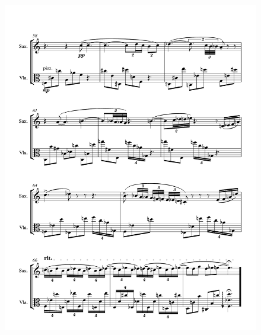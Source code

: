\begin{figure}[htbp]
    \centering
	\includegraphics[width=6.5in]{figures/Sax_Viola_21.pdf}
\end{figure}

